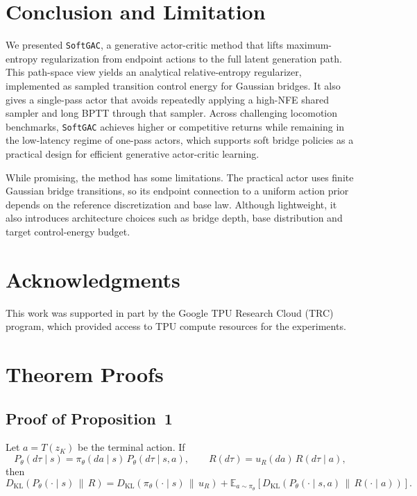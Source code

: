 \documentclass[11pt]{article}
\newcommand{\myalgo}{\texttt{SoftGAC}\xspace}
\begin{document}
\section{Conclusion and Limitation}
We presented \myalgo, a generative actor-critic method that lifts maximum-entropy regularization from endpoint actions to the full latent generation path. This path-space view yields an analytical relative-entropy regularizer, implemented as sampled transition control energy for Gaussian bridges. It also gives a single-pass actor that avoids repeatedly applying a high-NFE shared sampler and long BPTT through that sampler. Across challenging locomotion benchmarks, \myalgo achieves higher or competitive returns while remaining in the low-latency regime of one-pass actors, which supports soft bridge policies as a practical design for efficient generative actor-critic learning.

While promising, the method has some limitations. The practical actor uses finite Gaussian bridge transitions, so its endpoint connection to a uniform action prior depends on the reference discretization and base law. Although lightweight, it also introduces architecture choices such as bridge depth, base distribution and target control-energy budget.


\section*{Acknowledgments}
This work was supported in part by the Google TPU Research Cloud (TRC) program, which provided access to TPU compute resources for the experiments.




\clearpage

\tableofcontents

\clearpage

\appendix

\section{Theorem Proofs}
\label{app:proofs}

\subsection{Proof of Proposition~1}
\label{app:proof_path_lift}

\begin{restatement}
Let $a=T(z_K)$ be the terminal action. If
\[
  P_\theta(d\tau\mid s)
  =
  \pi_\theta(da\mid s)\,P_\theta(d\tau\mid s,a),
  \qquad
  R(d\tau)
  =
  u_R(da)\,R(d\tau\mid a),
\]
then
\[
  D_{\mathrm{KL}}
  \left(
    P_\theta(\cdot\mid s)
    \,\|\,R
  \right)
  =
  D_{\mathrm{KL}}
  \left(
    \pi_\theta(\cdot\mid s)
    \,\|\,u_R
  \right)
  +
  \mathbb E_{a\sim\pi_\theta}
  \left[
    D_{\mathrm{KL}}
    \left(
      P_\theta(\cdot\mid s,a)
      \,\|\,R(\cdot\mid a)
    \right)
  \right].
\]

\end{restatement}
\end{document}
